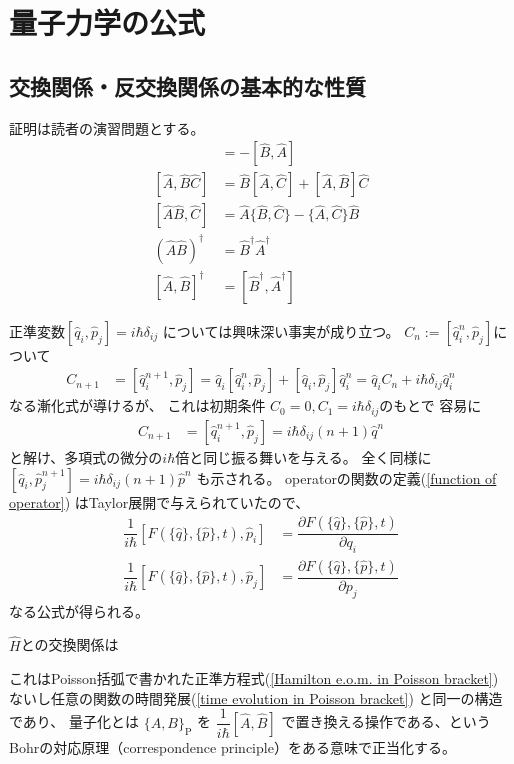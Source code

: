 \appendix
\renewcommand{\theequation}{A.\arabic{section}.\arabic{equation}}
\setcounter{equation}{0}

\section{量子力学の公式}

\subsection{交換関係・反交換関係の基本的な性質}

証明は読者の演習問題とする。
\begin{align}
    [\hat{A}, \hat{B}] &= - [\hat{B}, \hat{A}]
\\
    [\hat{A}, \hat{B}\hat{C}]
   &=
   \hat{B}[\hat{A}, \hat{C}]
+
    [\hat{A}, \hat{B}] \hat{C}
\label{A,BC to B(A,C) + (A,B)C}
\\
    [\hat{A}\hat{B}, \hat{C}]
   &=
   \hat{A}\{\hat{B}, \hat{C}\}
-
    \{\hat{A}, \hat{C}\} \hat{B}
\\
    \left(\hat{A}\hat{B}\right)^\dagger
    &=
    \hat{B}^\dagger\hat{A}^\dagger
\\
    [\hat{A}, \hat{B}]^\dagger
    &=
    [\hat{B}^\dagger, \hat{A}^\dagger]
\end{align}

正準変数$[\hat{q}_i, \hat{p}_j] = i\hbar\delta_{ij}$
については興味深い事実が成り立つ。
$C_n := [\hat{q}^n_i, \hat{p}_j]$について
\begin{align}
    C_{n+1}
    &=
    [\hat{q}^{n+1}_i, \hat{p}_j]
    =
    \hat{q}_i [\hat{q}_i^n, \hat{p}_j]
    +
    [\hat{q}_i, \hat{p}_j] \hat{q}_i^n
    =
    \hat{q}_i C_n
    +
    i\hbar\delta_{ij} \hat{q}_i^n
\end{align}
なる漸化式が導けるが、
これは初期条件
$C_0  = 0, C_1 = i\hbar\delta_{ij}$のもとで
容易に
\begin{align}
    C_{n+1} &= [\hat{q}^{n+1}_i, \hat{p}_j]
    = i\hbar\delta_{ij} (n+1) \hat{q}^n
\end{align}
と解け、多項式の微分の$i\hbar$倍と同じ振る舞いを与える。
全く同様に
$[\hat{q}_i, \hat{p}^{n+1}_j]
= i\hbar\delta_{ij} (n+1) \hat{p}^n$
も示される。
operatorの関数の定義(\ref{function of operator})
はTaylor展開で与えられていたので、
\begin{align}
    \dfrac{1}{i\hbar}
    [F(\{ \hat{q} \},\{ \hat{p} \}, t), \hat{p}_i]
    &=
    \dfrac{
        \partial F(\{ \hat{q} \},\{ \hat{p} \}, t)
    }{
        \partial q_i
    }
\\
    \dfrac{1}{i\hbar}
    [F(\{ \hat{q} \},\{ \hat{p} \}, t), \hat{p}_j]
    &=
    \dfrac{
        \partial F(\{ \hat{q} \},\{ \hat{p} \}, t)
    }{
        \partial p_j
    }
\end{align}
なる公式が得られる。

$\hat{H}$との交換関係は

これはPoisson括弧で書かれた正準方程式(\ref{Hamilton e.o.m. in Poisson bracket})
ないし任意の関数の時間発展(\ref{time evolution in Poisson bracket})
と同一の構造であり、
量子化とは
$\{A, B\}_{ \mathrm{P} }$
を
$\dfrac{1}{i\hbar} [\hat{A}, \hat{B}]$
で置き換える操作である、という
Bohrの対応原理（correspondence principle）をある意味で正当化する。
